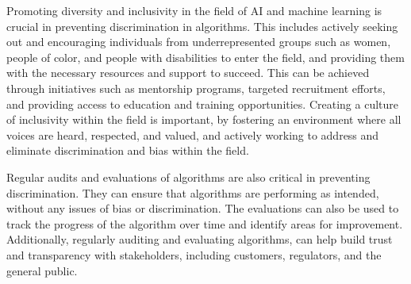 \documentclass[
	12pt,
    a4paper,
    egregdoesnotlikesansseriftitles, %
    toc=chapterentrywithdots,
    oneside, openany,
    titlepage,
    parskip=half,
    headings=normal,  %
    listof=totoc,
    bibliography=totocnumbered,
    index=totoc,
    captions=tableheading,  %
    listof=flat,
    numbers=noenddot, %
    final]
    {scrbook}
\begin{document}
%
%

Promoting diversity and inclusivity in the field of AI and machine learning is crucial in preventing discrimination in algorithms. 
This includes actively seeking out and encouraging individuals from underrepresented groups such as women, people of color, and people with disabilities to enter the field, and providing them with the necessary resources and support to succeed. 
This can be achieved through initiatives such as mentorship programs, targeted recruitment efforts, and providing access to education and training opportunities. 
Creating a culture of inclusivity within the field is important, by fostering an environment where all voices are heard, respected, and valued, and actively working to address and eliminate discrimination and bias within the field.

Regular audits and evaluations of algorithms are also critical in preventing discrimination. They can ensure that algorithms are performing as intended, without any issues of bias or discrimination.
The evaluations can also be used to track the progress of the algorithm over time and identify areas for improvement. 
Additionally, regularly auditing and evaluating algorithms, can help build trust and transparency with stakeholders, including customers, regulators, and the general public.
\end{document}
